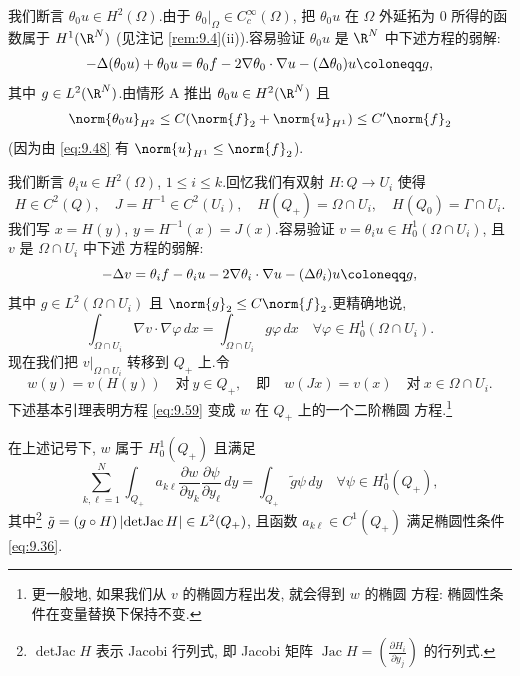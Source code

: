  我们断言 $\theta_0u\in H^2(\Omega)$.由于
$\theta_0|_\Omega\in C_c^\infty(\Omega)$, 把 $\theta_0u$ 在 $\Omega$ 外延拓为
$0$ 所得的函数属于 $H^1(\R^N)$ (见注记 \ref{rem:9.4}(ii)).容易验证
$\theta_0u$ 是 $\R^N$ 中下述方程的弱解:
\begin{equation*}
-\Delta(\theta_0u)+\theta_0u=\theta_0f-2\nabla\theta_0\cdot\nabla u
-(\Delta\theta_0)u\defeq g,
\end{equation*}
其中 $g\in L^2(\R^N)$.由情形 A 推出 $\theta_0u\in H^2(\R^N)$ 且
\begin{equation*}
\norm{\theta_0u}_{H^2}\le C(\norm{f}_2+\norm{u}_{H^1})
\le C'\norm{f}_2
\end{equation*}
(因为由 \eqref{eq:9.48} 有 $\norm{u}_{H^1}\le\norm{f}_2$).

 我们断言 $\theta_iu\in H^2(\Omega)$,
$1\le i\le k$.回忆我们有双射 $H:Q\to U_i$ 使得
\begin{equation*}
H\in C^2(Q),\quad J=H^{-1}\in C^2(U_i),\quad
H(Q_+)=\Omega\cap U_i,\quad H(Q_0)=\Gamma\cap U_i.
\end{equation*}
我们写 $x=H(y)$, $y=H^{-1}(x)=J(x)$.容易验证
$v=\theta_iu\in H_0^1(\Omega\cap U_i)$, 且 $v$ 是 $\Omega\cap U_i$ 中下述
方程的弱解:
\begin{equation*}
-\Delta v=\theta_if-\theta_iu-2\nabla\theta_i\cdot\nabla u
-(\Delta\theta_i)u\defeq g,
\end{equation*}
其中 $g\in L^2(\Omega\cap U_i)$ 且 $\norm{g}_2\le C\norm{f}_2$.更精确地说,
\begin{equation}
\int_{\Omega\cap U_i}\nabla v\cdot\nabla\varphi\,dx
=\int_{\Omega\cap U_i}g\varphi\,dx
\quad\forall\varphi\in H_0^1(\Omega\cap U_i).
\label{eq:9.59}
\end{equation}
现在我们把 $v|_{\Omega\cap U_i}$ 转移到 $Q_+$ 上.令
\begin{equation*}
w(y)=v(H(y))\quad\text{对}\ y\in Q_+,
\quad\text{即}\quad
w(Jx)=v(x)\quad\text{对}\ x\in\Omega\cap U_i.
\end{equation*}
下述基本引理表明方程 \eqref{eq:9.59} 变成 $w$ 在 $Q_+$ 上的一个二阶椭圆
方程.\footnote{更一般地, 如果我们从 $v$ 的椭圆方程出发, 就会得到 $w$ 的椭圆
方程: 椭圆性条件在变量替换下保持不变.}

\begin{lemma}
\label{lem:9.8}
在上述记号下, $w$ 属于 $H_0^1(Q_+)$ 且满足
\begin{equation}
\sum_{k,\ell=1}^N\int_{Q_+}a_{k\ell}\frac{\partial w}{\partial y_k}
\frac{\partial\psi}{\partial y_\ell}\,dy
=\int_{Q_+}\tilde g\psi\,dy\quad\forall\psi\in H_0^1(Q_+),
\label{eq:9.60}
\end{equation}
其中\footnote{$\operatorname{detJac}H$ 表示 Jacobi 行列式, 即 Jacobi 矩阵
$\operatorname{Jac}H=\left(\frac{\partial H_i}{\partial y_j}\right)$ 的行列式.}
$\tilde g=(g\circ H)\left|\operatorname{detJac}H\right|\in L^2(Q_+)$, 且函数
$a_{k\ell}\in C^1(Q_+)$ 满足椭圆性条件 \eqref{eq:9.36}.
\end{lemma}

